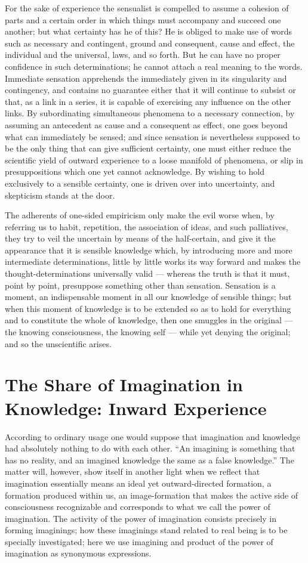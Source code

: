 \documentclass[12pt]{book}
\begin{document}
For the sake of experience the sensualist is compelled to assume a cohesion of
parts and a certain order in which things must accompany and succeed one
another; but what certainty has he of this? He is obliged to make use of words
such as necessary and contingent, ground and consequent, cause and effect, the
individual and the universal, laws, and so forth. But he can have no proper
confidence in such determinations; he cannot attach a real meaning to the
words. Immediate sensation apprehends the immediately given in its singularity
and contingency, and contains no guarantee either that it will continue to
subsist or that, as a link in a series, it is capable of exercising any
influence on the other links. By subordinating simultaneous phenomena to a
necessary connection, by assuming an antecedent as cause and a consequent as
effect, one goes beyond what can immediately be sensed; and since sensation is
nevertheless supposed to be the only thing that can give sufficient certainty,
one must either reduce the scientific yield of outward experience to a loose
manifold of phenomena, or slip in presuppositions which one yet cannot
acknowledge. By wishing to hold exclusively to a sensible certainty, one is
driven over into uncertainty, and skepticism stands at the door.

The adherents of one-sided empiricism only make the evil worse when, by
referring us to habit, repetition, the association of ideas, and such
palliatives, they try to veil the uncertain by means of the half-certain, and
give it the appearance that it is sensible knowledge which, by introducing
more and more intermediate determinations, little by little works its way
forward and makes the thought-determinations universally valid --- whereas the
truth is that it must, point by point, presuppose something other than
sensation. Sensation is a moment, an indispensable moment in all our knowledge
of sensible things; but when this moment of knowledge is to be extended so as
to hold for everything and to constitute the whole of knowledge, then one
smuggles in the original --- the knowing consciousness, the knowing self ---
while yet denying the original; and so the unscientific arises.

\section{The Share of Imagination in Knowledge: Inward Experience}
\label{sec:3}

\noindent According to ordinary usage one would suppose that imagination and
knowledge had absolutely nothing to do with each other. ``An imagining is
something that has no reality, and an imagined knowledge the same as a false
knowledge.'' The matter will, however, show itself in another light when we
reflect that imagination essentially means an ideal yet outward-directed
formation, a formation produced within us, an image-formation that makes the
active side of consciousness recognizable and corresponds to what we call the
power of imagination. The activity of the power of imagination consists
precisely in forming imaginings; how these imaginings stand related to real
being is to be specially investigated; here we use imagining and product of
the power of imagination as synonymous expressions.
\end{document}
